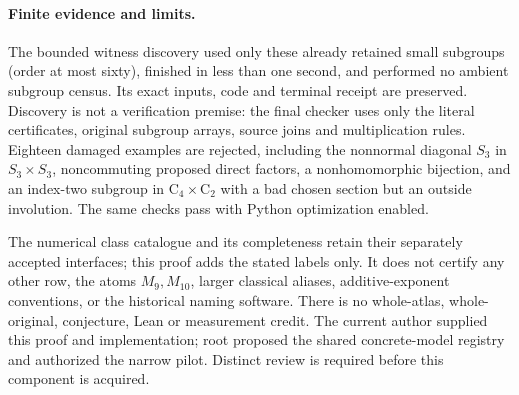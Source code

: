 \documentclass[10pt]{article}
\newcommand{\C}{\mathrm C}
\begin{document}
\paragraph{Finite evidence and limits.}
The bounded witness discovery used only these already retained small
subgroups (order at most sixty), finished in less than one second, and
performed no ambient subgroup census. Its exact inputs, code and terminal
receipt are preserved. Discovery is not a verification premise: the final
checker uses only the literal certificates, original subgroup arrays,
source joins and multiplication rules. Eighteen damaged examples are
rejected, including the nonnormal diagonal $S_3$ in $S_3\times S_3$,
noncommuting proposed direct factors, a nonhomomorphic bijection, and an
index-two subgroup in $\C_4\times\C_2$ with a bad chosen section but an
outside involution. The same checks pass with Python optimization enabled.

The numerical class catalogue and its completeness retain their separately
accepted interfaces; this proof adds the stated labels only. It does not
certify any other row, the atoms $M_9,M_{10}$, larger classical aliases,
additive-exponent conventions, or the historical naming software.
There is no whole-atlas, whole-original, conjecture, Lean or measurement
credit. The current author supplied this proof and implementation; root
proposed the shared concrete-model registry and authorized the narrow pilot.
Distinct review is required before this component is acquired.
\end{document}
